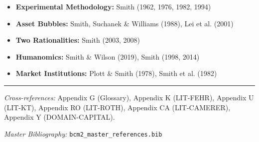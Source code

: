 \begin{itemize}[nosep]
    \item \textbf{Experimental Methodology:} Smith (1962, 1976, 1982, 1994)
    \item \textbf{Asset Bubbles:} Smith, Suchanek \& Williams (1988), Lei et al. (2001)
    \item \textbf{Two Rationalities:} Smith (2003, 2008)
    \item \textbf{Humanomics:} Smith \& Wilson (2019), Smith (1998, 2014)
    \item \textbf{Market Institutions:} Plott \& Smith (1978), Smith et al. (1982)
\end{itemize}



\vspace{1em}
\hrule
\vspace{0.5em}

\noindent\textit{Cross-references:}
Appendix G (Glossary),
Appendix K (LIT-FEHR),
Appendix U (LIT-KT),
Appendix RO (LIT-ROTH),
Appendix CA (LIT-CAMERER),
Appendix Y (DOMAIN-CAPITAL).

\noindent\textit{Master Bibliography:} \texttt{bcm2\_master\_references.bib}

